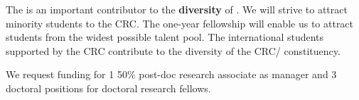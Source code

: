 The  is an important contributor to the \textbf{diversity} of
\thiscrc.  We will strive to attract minority students to the CRC. The
one-year fellowship will enable us to attract students from the widest
possible talent pool. The international students supported by the CRC
contribute to the diversity of the CRC/ constituency.

\notocsubsection{\funds}

We request funding for 1 50\% post-doc research associate as 
manager and 3 doctoral positions for doctoral research fellows.

